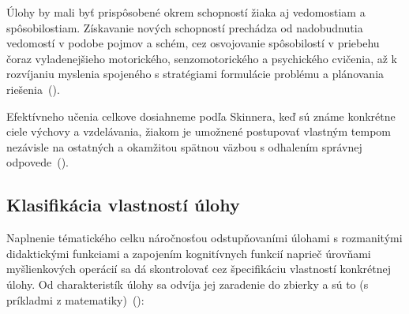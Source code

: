 Úlohy by mali byť prispôsobené okrem schopností žiaka aj vedomostiam a spôsobilostiam. Získavanie nových schopností prechádza od nadobudnutia vedomostí v podobe pojmov a schém, cez osvojovanie spôsobilostí v priebehu čoraz vyladenejšieho motorického, senzomotorického a psychického cvičenia, až k rozvíjaniu myslenia spojeného s stratégiami formulácie problému a plánovania riešenia~(\cite{pavlovkin_ziak_1989}).

Efektívneho učenia celkove dosiahneme podľa Skinnera, keď sú známe konkrétne ciele výchovy a vzdelávania, žiakom je umožnené postupovať vlastným tempom nezávisle na ostatných a okamžitou spätnou väzbou s odhalením správnej odpovede~(\cite{pavlovkin_ziak_1989}).


\subsection{Klasifikácia vlastností úlohy} \label{sec:klasifikacia-ulohy}
Naplnenie tématického celku náročnosťou odstupňovaními úlohami s rozmanitými didaktickými funkciami a zapojením kognitívnych funkcií naprieč úrovňami myšlienkových operácií sa dá skontrolovať cez špecifikáciu vlastností konkrétnej úlohy. Od charakteristík úlohy sa odvíja  jej zaradenie do zbierky a sú to (s príkladmi z matematiky)~(\cite{mindakova_tvorba_2008}):


